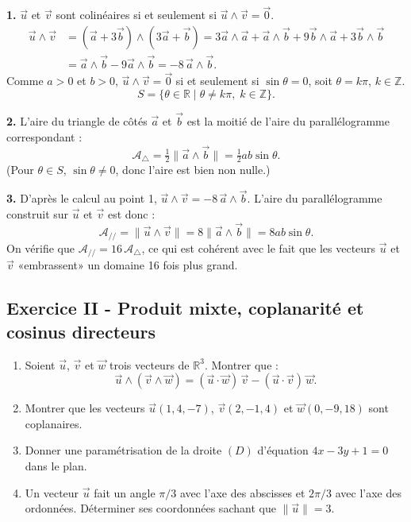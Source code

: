 \documentclass[12pt,a4paper]{article}
\begin{document}
\begin{boitecorrige}
\textbf{1.} $\vec{u}$ et $\vec{v}$ sont colinéaires si et seulement si $\vec{u}\wedge\vec{v} = \vec{0}$.
\begin{align*}
  \vec{u}\wedge\vec{v}
  &= (\vec{a}+3\vec{b})\wedge(3\vec{a}+\vec{b})
   = 3\vec{a}\wedge\vec{a} + \vec{a}\wedge\vec{b} + 9\vec{b}\wedge\vec{a} + 3\vec{b}\wedge\vec{b}\\
  &= \vec{a}\wedge\vec{b} - 9\vec{a}\wedge\vec{b} = -8\,\vec{a}\wedge\vec{b}.
\end{align*}
Comme $a>0$ et $b>0$, $\vec{u}\wedge\vec{v}=\vec{0}$ si et seulement si $\sin\theta = 0$, soit
$\theta = k\pi$, $k\in\mathbb{Z}$.
\[
  \boxed{S = \{\theta\in\mathbb{R} \mid \theta\neq k\pi,\; k\in\mathbb{Z}\}.}
\]

\textbf{2.} L'aire du triangle de côtés $\vec{a}$ et $\vec{b}$ est la moitié de l'aire du
parallélogramme correspondant :
\[
  \boxed{\mathcal{A}_{\triangle} = \tfrac{1}{2}\|\vec{a}\wedge\vec{b}\| = \tfrac{1}{2}ab\sin\theta.}
\]
(Pour $\theta\in S$, $\sin\theta\neq 0$, donc l'aire est bien non nulle.)

\textbf{3.} D'après le calcul au point 1, $\vec{u}\wedge\vec{v} = -8\,\vec{a}\wedge\vec{b}$.
L'aire du parallélogramme construit sur $\vec{u}$ et $\vec{v}$ est donc :
\[
  \boxed{\mathcal{A}_{\text{//}} = \|\vec{u}\wedge\vec{v}\| = 8\|\vec{a}\wedge\vec{b}\|
         = 8ab\sin\theta.}
\]
On vérifie que $\mathcal{A}_{\text{//}} = 16\,\mathcal{A}_\triangle$, ce qui est cohérent avec
le fait que les vecteurs $\vec{u}$ et $\vec{v}$ «embrassent» un domaine 16 fois plus grand.
\end{boitecorrige}

\subsection*{Exercice II - Produit mixte, coplanarité et cosinus directeurs \niveau{\moyen}}

\begin{boiteexercice}
\begin{enumerate}
  \item Soient $\vec{u}$, $\vec{v}$ et $\vec{w}$ trois vecteurs de $\mathbb{R}^3$. Montrer que :
    \[
      \vec{u}\wedge(\vec{v}\wedge\vec{w}) = (\vec{u}\cdot\vec{w})\,\vec{v} - (\vec{u}\cdot\vec{v})\,\vec{w}.
    \]
  \item Montrer que les vecteurs $\vec{u}(1,4,-7)$, $\vec{v}(2,-1,4)$ et $\vec{w}(0,-9,18)$ sont
    coplanaires.
  \item Donner une paramétrisation de la droite $(D)$ d'équation $4x-3y+1=0$ dans le plan.
  \item Un vecteur $\vec{u}$ fait un angle $\pi/3$ avec l'axe des abscisses et $2\pi/3$ avec l'axe
    des ordonnées. Déterminer ses coordonnées sachant que $\|\vec{u}\|=3$.
\end{enumerate}
\end{boiteexercice}
\end{document}
